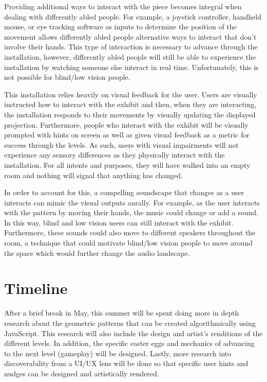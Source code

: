\documentclass[10pt,twocolumn]{article}
\begin{document}
Providing additional ways to interact with the piece becomes integral when dealing with differently abled people. For example, a joystick controller, handheld mouse, or eye tracking software as inputs to determine the position of the movement allows differently abled people alternative ways to interact that don't involve their hands. This type of interaction is necessary to advance through the installation, however, differently abled people will still be able to experience the installation by watching someone else interact in real time. Unfortunately, this is not possible for blind/low vision people. 

This installation relies heavily on visual feedback for the user.  Users are visually instructed how to interact with the exhibit and then, when they are interacting, the installation responds to their movements by visually updating the displayed projection.  Furthermore, people who interact with the exhibit will be visually prompted with hints on screen as well as given visual feedback as a metric for success through the levels. As such, users with visual impairments will not experience any sensory differences as they physically interact with the installation.  For all intents and purposes, they will have walked into an empty room and nothing will signal that anything has changed. 

In order to account for this, a compelling soundscape that changes as a user interacts can mimic the visual outputs aurally. For example, as the user interacts with the pattern by moving their hands, the music could change or add a sound.  In this way, blind and low vision users can still interact with the exhibit. Furthermore, these sounds could also move to different speakers throughout the room, a technique that could motivate blind/low vision people to move around the space which would further change the audio landscape. 

\section{Timeline}
After a brief break in May, this summer will be spent doing more in depth research about the geometric patterns that can be created algorithmically using JavaScript.  This research will also include the design and artist's renditions of the different levels.  In addition, the specific easter eggs and mechanics of advancing to the next level (gameplay) will be designed. Lastly, more research into discoverability from a UI/UX lens will be done so that specific user hints and nudges can be designed and artistically rendered.  
\end{document}
